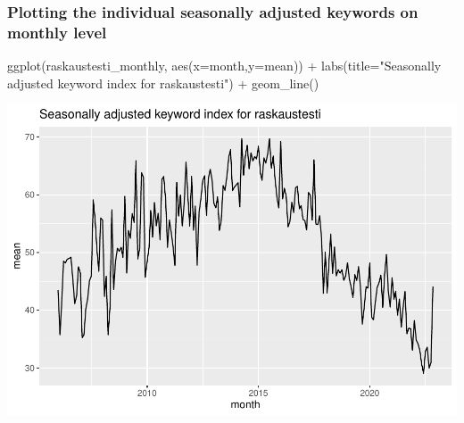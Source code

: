 \documentclass[
]{article}
\newenvironment{Shaded}{\begin{snugshade}}{\end{snugshade}}
\newcommand{\AttributeTok}[1]{\textcolor[rgb]{0.77,0.63,0.00}{#1}}
\newcommand{\FunctionTok}[1]{\textcolor[rgb]{0.00,0.00,0.00}{#1}}
\newcommand{\NormalTok}[1]{#1}
\newcommand{\OtherTok}[1]{\textcolor[rgb]{0.56,0.35,0.01}{#1}}
\newcommand{\SpecialCharTok}[1]{\textcolor[rgb]{0.00,0.00,0.00}{#1}}
\newcommand{\StringTok}[1]{\textcolor[rgb]{0.31,0.60,0.02}{#1}}
\begin{document}
\begin{Shaded}
\end{Shaded}

\hypertarget{plotting-the-individual-seasonally-adjusted-keywords-on-monthly-level}{%
\subsubsection{Plotting the individual seasonally adjusted keywords on
monthly
level}\label{plotting-the-individual-seasonally-adjusted-keywords-on-monthly-level}}

\begin{Shaded}
\begin{Highlighting}[]
\FunctionTok{ggplot}\NormalTok{(raskaustesti\_monthly, }\FunctionTok{aes}\NormalTok{(}\AttributeTok{x=}\NormalTok{month,}\AttributeTok{y=}\NormalTok{mean)) }\SpecialCharTok{+} \FunctionTok{labs}\NormalTok{(}\AttributeTok{title=}\StringTok{"Seasonally adjusted keyword index for raskaustesti"}\NormalTok{) }\SpecialCharTok{+} \FunctionTok{geom\_line}\NormalTok{()}
\end{Highlighting}
\end{Shaded}

\includegraphics{GoogleTrendsMarkdown_files/figure-latex/unnamed-chunk-9-1.pdf}
\end{document}
